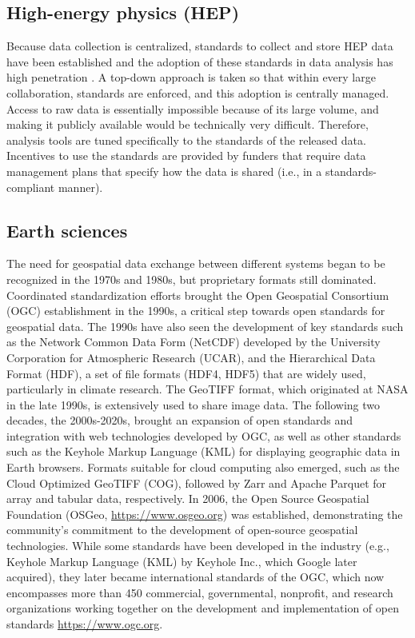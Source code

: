 \documentclass[
  number]{elsarticle}
\begin{document}
\subsection{High-energy physics (HEP)}\label{high-energy-physics-hep}

Because data collection is centralized, standards to collect and store
HEP data have been established and the adoption of these standards in
data analysis has high penetration \citep{Basaglia2023-dq}. A top-down
approach is taken so that within every large collaboration, standards
are enforced, and this adoption is centrally managed. Access to raw data
is essentially impossible because of its large volume, and making it
publicly available would be technically very difficult. Therefore,
analysis tools are tuned specifically to the standards of the released
data. Incentives to use the standards are provided by funders that
require data management plans that specify how the data is shared (i.e.,
in a standards-compliant manner).

\subsection{Earth sciences}\label{earth-sciences}

The need for geospatial data exchange between different systems began to
be recognized in the 1970s and 1980s, but proprietary formats still
dominated. Coordinated standardization efforts brought the Open
Geospatial Consortium (OGC) establishment in the 1990s, a critical step
towards open standards for geospatial data. The 1990s have also seen the
development of key standards such as the Network Common Data Form
(NetCDF) developed by the University Corporation for Atmospheric
Research (UCAR), and the Hierarchical Data Format (HDF), a set of file
formats (HDF4, HDF5) that are widely used, particularly in climate
research. The GeoTIFF format, which originated at NASA in the late
1990s, is extensively used to share image data. The following two
decades, the 2000s-2020s, brought an expansion of open standards and
integration with web technologies developed by OGC, as well as other
standards such as the Keyhole Markup Language (KML) for displaying
geographic data in Earth browsers. Formats suitable for cloud computing
also emerged, such as the Cloud Optimized GeoTIFF (COG), followed by
Zarr and Apache Parquet for array and tabular data, respectively. In
2006, the Open Source Geospatial Foundation (OSGeo,
\url{https://www.osgeo.org}) was established, demonstrating the
community's commitment to the development of open-source geospatial
technologies. While some standards have been developed in the industry
(e.g., Keyhole Markup Language (KML) by Keyhole Inc., which Google later
acquired), they later became international standards of the OGC, which
now encompasses more than 450 commercial, governmental, nonprofit, and
research organizations working together on the development and
implementation of open standards \url{https://www.ogc.org}.
\end{document}
